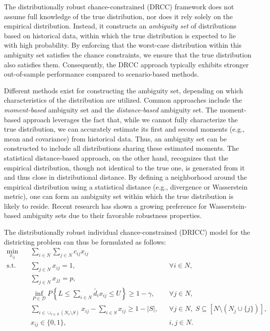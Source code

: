 \documentclass[preprint,12pt,authoryear]{elsarticle}
\begin{document}
The distributionally robust chance-constrained (DRCC) framework does not assume full knowledge of the true distribution, nor does it rely solely on the empirical distribution. Instead, it constructs an \textit{ambiguity set} of distributions based on historical data, within which the true distribution is expected to lie with high probability. By enforcing that the worst-case distribution within this ambiguity set satisfies the chance constraints, we ensure that the true distribution also satisfies them. Consequently, the DRCC approach typically exhibits stronger out-of-sample performance compared to scenario-based methods.

Different methods exist for constructing the ambiguity set, depending on which characteristics of the distribution are utilized. Common approaches include the \textit{moment-based} ambiguity set and the \textit{distance-based} ambiguity set. The moment-based approach leverages the fact that, while we cannot fully characterize the true distribution, we can accurately estimate its first and second moments (e.g., mean and covariance) from historical data. Thus, an ambiguity set can be constructed to include all distributions sharing these estimated moments. The statistical distance-based approach, on the other hand, recognizes that the empirical distribution, though not identical to the true one, is generated from it and thus close in distributional distance. By defining a neighborhood around the empirical distribution using a statistical distance (e.g., divergence or Wasserstein metric), one can form an ambiguity set within which the true distribution is likely to reside. Recent research has shown a growing preference for Wasserstein-based ambiguity sets due to their favorable robustness properties.

The distributionally robust individual chance-constrained (DRICC) model for the districting problem can thus be formulated as follows:
\begin{align}
\min_{x_{ij}} \quad & \sum_{i \in N} \sum_{j \in N} c_{ij} x_{ij} \label{eq:dricc_obj} \\
\text{s.t.} \quad & \sum_{j \in N} x_{ij} = 1, && \forall i \in N, \label{eq:dricc_assign} \\
& \sum_{j \in N} x_{jj} = p, \label{eq:dricc_districts} \\
& \inf_{P \in \mathcal{D}} P \left\{L \leqslant \sum_{i \in N} \widetilde{d_i} x_{ij} \leqslant U \right\} \geqslant 1 - \gamma, && \forall j \in N, \label{eq:dricc_constraint} \\
& \sum_{i \in \cup_{v \in S}(N_v \setminus S)} x_{ij} - \sum_{i \in S} x_{ij} \geqslant 1 - |S|, && \forall j \in N, \; S \subseteq [N \setminus (N_j \cup \{j\})], \label{eq:dricc_contiguity} \\
& x_{ij} \in \{0,1\}, && i,j \in N. \label{eq:dricc_binary}
\end{align}
\end{document}
